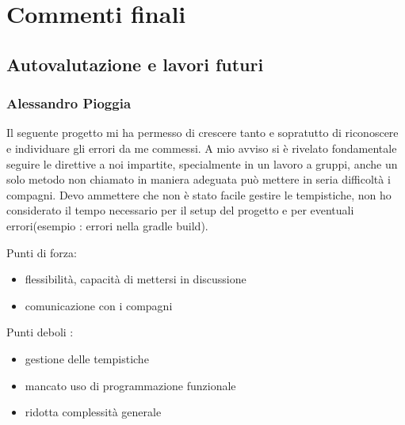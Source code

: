 
\chapter{Commenti finali}

\section{Autovalutazione e lavori futuri}


\subsection*{Alessandro Pioggia}

Il seguente progetto mi ha permesso di crescere tanto e sopratutto di riconoscere e individuare gli errori da me commessi.
A mio avviso si è rivelato fondamentale seguire le direttive a noi impartite, specialmente in un lavoro a gruppi, anche un solo metodo non chiamato in maniera adeguata può mettere in seria difficoltà i compagni.
Devo ammettere che non è stato facile gestire le tempistiche, non ho considerato il tempo necessario per il setup del progetto e per eventuali errori(esempio : errori nella gradle build).
\\

\begin{flushleft}
	Punti di forza:
\end{flushleft}

\begin{itemize}
	\item flessibilità, capacità di mettersi in discussione
	\item comunicazione con i compagni
\end{itemize}

\begin{flushleft}
	Punti deboli :
\end{flushleft}

\begin{itemize}
	\item gestione delle tempistiche
	\item mancato uso di programmazione funzionale
	\item ridotta complessità generale
\end{itemize}

